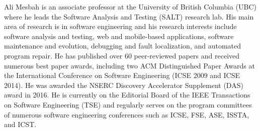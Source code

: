 \documentclass[10pt,journal,compsoc]{IEEEtran}
\begin{document}
\begin{IEEEbiography}{Ali Mesbah}
is an associate professor at the University of British Columbia (UBC) where he leads the Software Analysis and Testing (SALT) research lab. His main area of research is in software engineering and his research interests include software analysis and testing, web and mobile-based applications, software maintenance and evolution, debugging and fault localization, and automated program repair. He has published over 60 peer-reviewed papers and received numerous best paper awards, including two ACM Distinguished Paper Awards at the International Conference on Software Engineering (ICSE 2009 and ICSE 2014). He was awarded the NSERC Discovery Accelerator Supplement (DAS) award in 2016. He is currently on the Editorial Board of the IEEE Transactions on Software Engineering (TSE) and regularly serves on the program committees of numerous software engineering conferences such as ICSE, FSE, ASE, ISSTA, and ICST.
\end{IEEEbiography}







\end{document}
